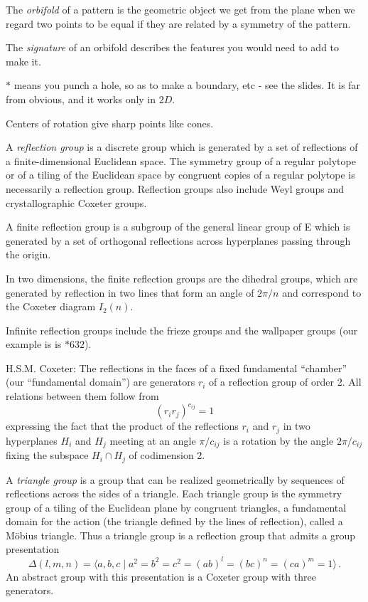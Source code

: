 \begin{description}
The \emph{orbifold} of a pattern is the geometric object we get from the
plane when we regard two points to be equal if they are related by
a symmetry of the pattern.

The \emph{signature} of an orbifold describes the features you would need
to add to make it.

$*$ means you punch a hole, so as to make a boundary, etc - see the slides.
It is far from obvious, and it works only in $2D$.

Centers of rotation give sharp points like cones.

%
A \emph{reflection group} is a discrete group which is generated by a set of
reflections of a finite-dimensional Euclidean space. The symmetry group
of a regular polytope or of a tiling of the Euclidean space by congruent
copies of a regular polytope is necessarily a reflection group.
Reflection groups also include Weyl groups and crystallographic Coxeter
groups.

A finite reflection group is a subgroup of the general linear group of E
which is generated by a set of orthogonal reflections across hyperplanes
passing through the origin.

In two dimensions, the finite reflection groups are the dihedral groups,
which are generated by reflection in two lines that form an angle of
$2\pi/n$ and correspond to the Coxeter diagram $I_2(n)$.

Infinite reflection groups include the frieze groups and the wallpaper
groups (our example is is $*632$).

H.S.M. Coxeter: The reflections in the faces of a
fixed fundamental ``chamber'' (our ``fundamental domain'') are generators
$r_i$ of a reflection group of order 2. All relations between them follow
from
\[
    (r_i r_j)^{c_{ij}}=1
\]
expressing the fact that the product of the reflections $r_i$  and $r_j$
in two hyperplanes $H_i$  and $H_j$ meeting at an angle $\pi/c_{ij}$ is a
rotation by the angle $2\pi/c_{ij}$ fixing the subspace $H_i \cap H_j$ of
codimension 2.

%
A \emph{triangle group} is a group that can be realized geometrically by
sequences of reflections across the sides of a triangle. Each triangle
group is the symmetry group of a tiling of the Euclidean plane by
congruent triangles, a fundamental domain for the action
 (the triangle defined by the lines of reflection), called a
M\"obius triangle.
Thus a triangle group is a reflection group that admits a  group presentation
\[
\Delta(l,m,n) = \langle a,b,c
\mid a^{2} =  b^{2} = c^{2} = (ab)^{l} = (bc)^{n} = (ca)^{m} =  1 \rangle
\,.
\]
An abstract group with this presentation is a Coxeter group with three
generators.


\end{description}
